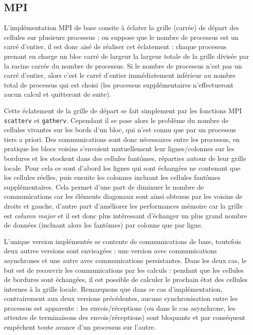 \subsection{MPI}

L'implémentation MPI de base consite à éclater la grille (carrée) de départ des cellules sur plusieurs processus ; on suppose que le nombre de processus est un carré d'entier, il est donc aisé de réaliser cet éclatement : chaque processus prenant en charge un bloc carré de largeur la largeur totale de la grille divisée par la racine carrée du nombre de processus. Si le nombre de processus n'est pas un carré d'entier, alors c'est le carré d'entier immédiatement inférieur au nombre total de processus qui est choisi (les processus supplémentaires n'effectueront aucun calcul et quitteront de suite).

Cette éclatement de la grille de départ se fait simplement par les fonctions MPI \texttt{scatterv} et \texttt{gatherv}. Cependant il se pose alors le problème du nombre de cellules vivantes sur les bords d'un bloc, qui n'est connu que par un processus tiers a priori. Des communications sont donc nécessaires entre les processus, en pratique les blocs voisins s'envoient mutuellement leur lignes/colonnes sur les bordures et les stockent dans des cellules fantômes, réparties autour de leur grille locale. Pour cela ce sont d'abord les lignes qui sont échangées ne contenant que les cellules réelles, puis ensuite les colonnes incluant les cellules fantômes supplémentaires. Cela permet d'une part de diminuer le nombre de communications car les éléments diagonaux sont ainsi obtenus par les voisins de droite et gauche, d'autre part d'améliorer les performances mémoire car la grille est \emph{column major} et il est donc plus intéressant d'échanger un plus grand nombre de données (incluant alors les fantômes) par colonne que par ligne.

L'unique version implémentée se contente de communications de base, toutefois deux autres versions sont envisagées : une version avec communications asynchrones et une autre avec communications persistantes. Dans les deux cas, le but est de recouvrir les communications par les calculs : pendant que les cellules de bordures sont échangées, il est possible de calculer le prochain état des cellules internes à la grille locale. Remarquons que dans ce cas d'implémentation, contrairement aux deux versions précédentes, aucune synchronisation entre les processus est apparente : les envois/réceptions (ou dans le cas asynchrone, les attentes de terminaisons des envois/réceptions) sont bloquants et par conséquent empêchent toute avance d'un processus sur l'autre.
